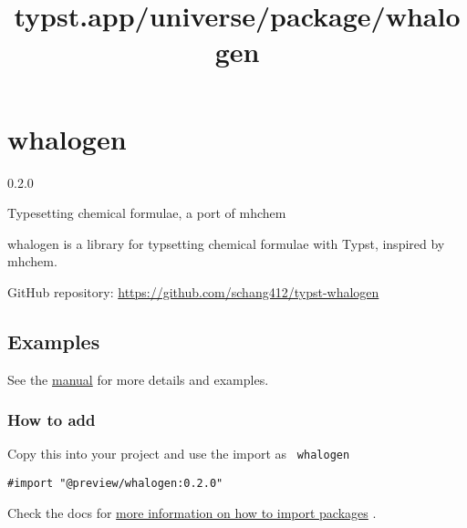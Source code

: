 \title{typst.app/universe/package/whalogen}

\label{banner}
\section{whalogen}\label{whalogen}

{ 0.2.0 }

Typesetting chemical formulae, a port of mhchem

\label{readme}
whalogen is a library for typsetting chemical formulae with Typst,
inspired by mhchem.

GitHub repository: \url{https://github.com/schang412/typst-whalogen}

\subsection{Examples}\label{examples}


\begin{Shaded}
\begin{Highlighting}[]

\end{Highlighting}
\end{Shaded}

See the
\href{https://github.com/typst/packages/raw/main/packages/preview/whalogen/0.2.0/manual.pdf}{manual}
for more details and examples.

\subsubsection{How to add}\label{how-to-add}

Copy this into your project and use the import as \texttt{\ whalogen\ }

\begin{verbatim}
#import "@preview/whalogen:0.2.0"
\end{verbatim}



Check the docs for
\href{https://typst.app/docs/reference/scripting/\#packages}{more
information on how to import packages} .

